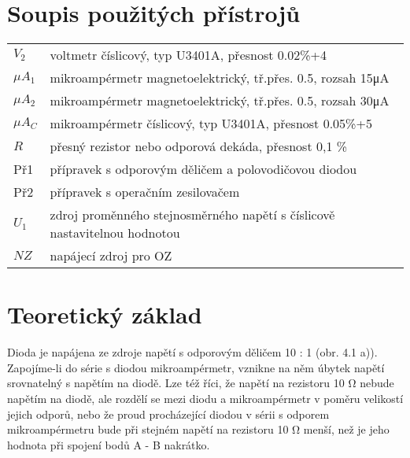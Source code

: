 \documentclass{article}
\begin{document}
	\section{Soupis použitých přístrojů}
	\begin{tabular}{ll}
		$V_2$ & voltmetr číslicový, typ U3401A, přesnost 0.02\%+4  \\
		$\mu A_1$ & mikroampérmetr magnetoelektrický, tř.přes. 0.5, rozsah 15\si{\micro\ampere}  \\
		$\mu A_2$ & mikroampérmetr magnetoelektrický, tř.přes. 0.5, rozsah 30\si{\micro\ampere}  \\
		$\mu A_C$ & mikroampérmetr číslicový, typ U3401A, přesnost 0.05\%+5  \\
		$R$ & přesný rezistor nebo odporová dekáda, přesnost 0,1 \%  \\
		Př1 & přípravek s odporovým děličem a polovodičovou diodou \\
		Př2 & přípravek s operačním zesilovačem \\
		$U_1$ & zdroj proměnného stejnosměrného napětí s číslicově nastavitelnou hodnotou  \\
		$NZ$ & napájecí zdroj pro OZ  \\
	\end{tabular}
	\section{Teoretický základ}
	Dioda je napájena ze zdroje napětí s odporovým děličem 10 : 1 (obr. 4.1 a)). Zapojíme-li do série s diodou mikroampérmetr, vznikne na něm úbytek napětí srovnatelný s napětím na diodě. Lze též říci, že napětí na rezistoru 10 \si{\ohm} nebude napětím na 	diodě, ale rozdělí se mezi diodu a mikroampérmetr v poměru velikostí jejich odporů, nebo že 	proud  procházející  diodou  v  sérii  s  odporem mikroampérmetru  bude  při  stejném  napětí  na rezistoru 10 \si{\ohm} menší, než je jeho hodnota při spojení bodů A - B nakrátko.
	
\end{document}
